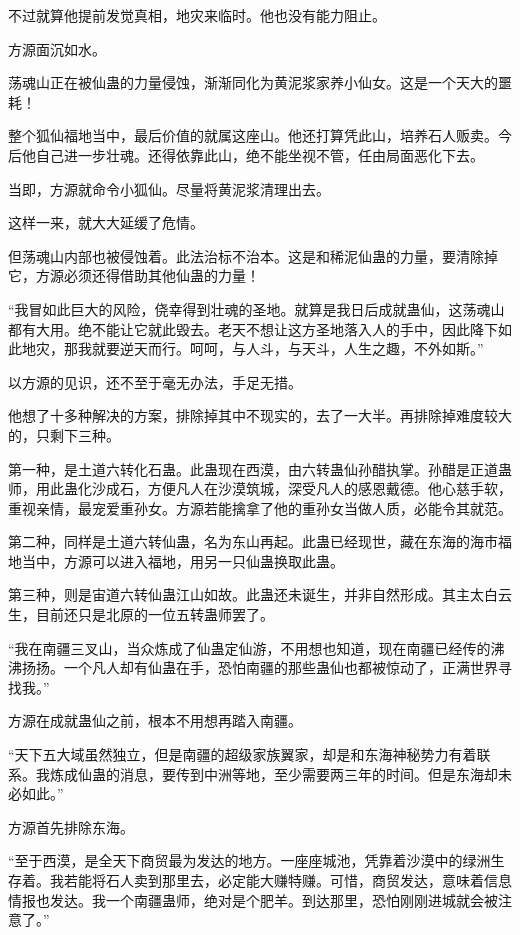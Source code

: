 \begin{this_body}
不过就算他提前发觉真相，地灾来临时。他也没有能力阻止。

方源面沉如水。

荡魂山正在被仙蛊的力量侵蚀，渐渐同化为黄泥浆家养小仙女。这是一个天大的噩耗！

整个狐仙福地当中，最后价值的就属这座山。他还打算凭此山，培养石人贩卖。今后他自己进一步壮魂。还得依靠此山，绝不能坐视不管，任由局面恶化下去。

当即，方源就命令小狐仙。尽量将黄泥浆清理出去。

这样一来，就大大延缓了危情。

但荡魂山内部也被侵蚀着。此法治标不治本。这是和稀泥仙蛊的力量，要清除掉它，方源必须还得借助其他仙蛊的力量！

“我冒如此巨大的风险，侥幸得到壮魂的圣地。就算是我日后成就蛊仙，这荡魂山都有大用。绝不能让它就此毁去。老天不想让这方圣地落入人的手中，因此降下如此地灾，那我就要逆天而行。呵呵，与人斗，与天斗，人生之趣，不外如斯。”

以方源的见识，还不至于毫无办法，手足无措。

他想了十多种解决的方案，排除掉其中不现实的，去了一大半。再排除掉难度较大的，只剩下三种。

第一种，是土道六转化石蛊。此蛊现在西漠，由六转蛊仙孙醋执掌。孙醋是正道蛊师，用此蛊化沙成石，方便凡人在沙漠筑城，深受凡人的感恩戴德。他心慈手软，重视亲情，最宠爱重孙女。方源若能擒拿了他的重孙女当做人质，必能令其就范。

第二种，同样是土道六转仙蛊，名为东山再起。此蛊已经现世，藏在东海的海市福地当中，方源可以进入福地，用另一只仙蛊换取此蛊。

第三种，则是宙道六转仙蛊江山如故。此蛊还未诞生，并非自然形成。其主太白云生，目前还只是北原的一位五转蛊师罢了。

“我在南疆三叉山，当众炼成了仙蛊定仙游，不用想也知道，现在南疆已经传的沸沸扬扬。一个凡人却有仙蛊在手，恐怕南疆的那些蛊仙也都被惊动了，正满世界寻找我。”

方源在成就蛊仙之前，根本不用想再踏入南疆。

“天下五大域虽然独立，但是南疆的超级家族翼家，却是和东海神秘势力有着联系。我炼成仙蛊的消息，要传到中洲等地，至少需要两三年的时间。但是东海却未必如此。”

方源首先排除东海。

“至于西漠，是全天下商贸最为发达的地方。一座座城池，凭靠着沙漠中的绿洲生存着。我若能将石人卖到那里去，必定能大赚特赚。可惜，商贸发达，意味着信息情报也发达。我一个南疆蛊师，绝对是个肥羊。到达那里，恐怕刚刚进城就会被注意了。”


\end{this_body}
